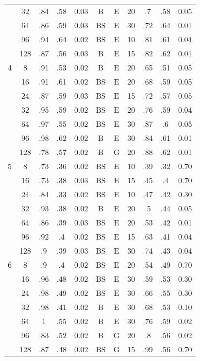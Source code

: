 \begin{table}
\begin{tabular}{|c|c|cccccc||ccc|}
  &  32 &   .84 &  .58 &     0.03 &       B &         E & 20 &    .7 &  .58 & 0.05 \\
  &  64 &   .86 &  .59 &     0.03 &      BS &         E & 30 &   .72 &  .64 & 0.01 \\
  &  96 &   .94 &  .64 &     0.02 &      BS &         E & 10 &   .81 &  .61 & 0.04 \\
  & 128 &   .87 &  .56 &     0.03 &       B &         E & 15 &   .82 &  .62 & 0.01 \\\hline
4 &   8 &   .91 &  .53 &     0.02 &       B &         E & 20 &   .65 &  .51 & 0.05 \\
  &  16 &   .91 &  .61 &     0.02 &      BS &         E & 20 &   .68 &  .59 & 0.05 \\
  &  24 &   .87 &  .59 &     0.03 &      BS &         E & 15 &   .72 &  .57 & 0.05 \\
  &  32 &   .95 &  .59 &     0.02 &      BS &         E & 20 &   .76 &  .59 & 0.04 \\
  &  64 &   .97 &  .55 &     0.02 &      BS &         E & 30 &   .87 &   .6 & 0.05 \\
  &  96 &   .98 &  .62 &     0.02 &       B &         E & 30 &   .84 &  .61 & 0.01 \\
  & 128 &   .78 &  .57 &     0.02 &       B &         G & 20 &   .88 &  .62 & 0.01 \\\hline
5 &   8 &   .73 &  .36 &     0.02 &      BS &         E & 10 &   .39 &  .32 & 0.70 \\
  &  16 &   .73 &  .38 &     0.03 &      BS &         E & 15 &   .45 &   .4 & 0.70 \\
  &  24 &   .84 &  .33 &     0.02 &      BS &         E & 10 &   .47 &  .42 & 0.30 \\
  &  32 &   .93 &  .38 &     0.02 &       B &         E & 20 &    .5 &  .44 & 0.05 \\
  &  64 &   .86 &  .39 &     0.03 &      BS &         E & 20 &   .53 &  .42 & 0.01 \\
  &  96 &   .92 &   .4 &     0.02 &      BS &         E & 15 &   .63 &  .41 & 0.04 \\
  & 128 &    .9 &  .39 &     0.03 &      BS &         E & 30 &   .74 &  .43 & 0.04 \\\hline
6 &   8 &    .9 &   .4 &     0.02 &      BS &         E & 20 &   .54 &  .49 & 0.70 \\
  &  16 &   .96 &  .48 &     0.02 &      BS &         E & 30 &   .59 &  .53 & 0.30 \\
  &  24 &   .98 &  .49 &     0.02 &      BS &         E & 30 &   .66 &  .55 & 0.30 \\
  &  32 &   .98 &  .41 &     0.02 &       B &         E & 30 &   .68 &  .53 & 0.10 \\
  &  64 &     1 &  .55 &     0.02 &       B &         E & 30 &   .76 &  .59 & 0.02 \\
  &  96 &   .83 &  .52 &     0.02 &       B &         G & 20 &    .8 &  .56 & 0.02 \\
  & 128 &   .87 &  .48 &     0.02 &      BS &         G & 15 &   .99 &  .56 & 0.70 \\\hline
\end{tabular}
\end{table}
